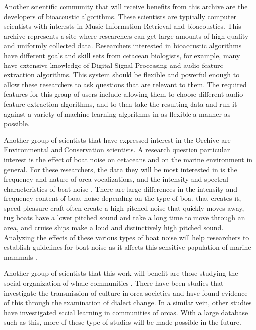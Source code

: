 \documentclass[12pt,oneside]{book}
\begin{document}
Another scientific community that will receive benefits from this
archive are the developers of bioacoustic algorithms.  These
scientists are typically computer scientists with interests in Music
Information Retrieval and bioacoustics.  This archive represents a
site where researchers can get large amounts of high quality and
uniformly collected data.  Researchers interested in bioacoustic
algorithms have different goals and skill sets from cetacean
biologists, for example, many have extensive knowledge of Digital
Signal Processing and audio feature extraction algorithms.  This
system should be flexible and powerful enough to allow these
researchers to ask questions that are relevant to them.  The required
features for this group of users include allowing them to choose
different audio feature extraction algorithms, and to then take the
resulting data and run it against a variety of machine learning
algorithms in as flexible a manner as possible.

Another group of scientists that have expressed interest in the
Orchive are Environmental and Conservation scientists. A research
question particular interest is the effect of boat noise
\cite{foote04} on cetaceans and on the marine
environment in general.  For these researchers, the data they will be
most interested in is the frequency and nature of orca vocalizations,
and the intensity and spectral characteristics of boat noise
\cite{holt09}.  There are large differences in the
intensity and frequency content of boat noise depending on the type of
boat that creates it, speed pleasure craft often create a high pitched
noise that quickly moves away, tug boats have a lower pitched sound
and take a long time to move through an area, and cruise ships make a
loud and distinctively high pitched sound.  Analyzing the effects of
these various types of boat noise will help researchers to establish
guidelines for boat noise as it affects this sensitive population of
marine mammals \cite{doksaeter09}.

Another group of scientists that this work will benefit are those
studying the social organization of whale communities
\cite{bigg90_orca_genealogy}.  There have been studies that
investigate the transmission of culture in orca societies
\cite{deecke00} and have found evidence of this through the
examination of dialect change.  In a similar vein, other studies have
investigated social learning \cite{janik00_orca_social_communication}
in communities of orcas.  With a large database such as this, more of
these type of studies will be made possible in the future.
\end{document}
